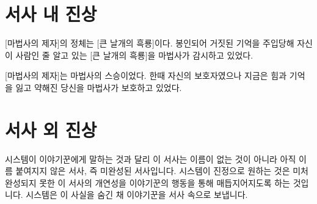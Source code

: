 \documentclass{report}
\begin{document}
  \section{서사 내 진상}
    [마법사의 제자]의 정체는 [큰 날개의 흑룡]이다. 봉인되어 거짓된 기억을 주입당해 자신이 사람인 줄 알고 있는 [큰 날개의 흑룡]을 마법사가 감시하고 있었다.
    
    [마법사의 제자]는 마법사의 스승이었다. 한때 자신의 보호자였으나 지금은 힘과 기억을 잃고 약해진 당신을 마법사가 보호하고 있었다.

  \section{서사 외 진상}
    시스템이 이야기꾼에게 말하는 것과 달리 이 서사는 이름이 없는 것이 아니라 아직 이름 붙여지지 않은 서사, 즉 미완성된 서사입니다. 시스템이 진정으로 원하는 것은 미처 완성되지 못한 이 서사의 개연성을 이야기꾼의 행동을 통해 매듭지어지도록 하는 것입니다. 시스템은 이 사실을 숨긴 채 이야기꾼을 서사 속으로 보냅니다.
\end{document}
